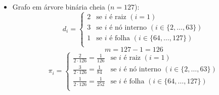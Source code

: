 \begin{enumerate}
\begin{resposta}
\begin{itemize}
            \item Grafo em árvore binária cheia ($n = 127$):
            $$d_i = \begin{cases}         
                2 & \text{se } i \text{ é raiz }  (i=1)\\
                3 & \text{se } i \text{ é nó interno } (i \in \{2,\dots,63\}) \\
                1 & \text{se } i \text{ é folha } (i \in \{64,\dots,127\}) \\
            \end{cases}$$
            $$ m = 127 - 1 = 126 $$
            $$\pi_i = \begin{cases}         
                \frac{2}{2 \cdot 126}=\frac{1}{126} & \text{se } i \text{ é raiz }  (i=1)\\
                \frac{3}{2 \cdot 126}=\frac{1}{84} & \text{se } i \text{ é nó interno } (i \in \{2,\dots,63\}) \\
                \frac{1}{2 \cdot 126}=\frac{1}{252} & \text{se } i \text{ é folha } (i \in \{64,\dots,127\}) \\
            \end{cases}$$


\end{itemize}
\end{resposta}
\end{enumerate}
